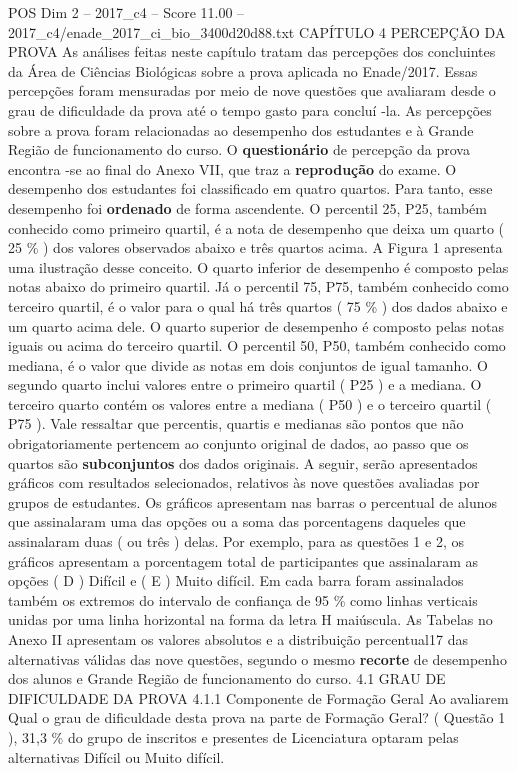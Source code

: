 \begin{textsample}{POS Dim 2 – 2017\_c4 – Score 11.00 – 2017\_c4/enade\_2017\_ci\_bio\_3400d20d88.txt}  \label{ex:f2_pos_096}
CAPÍTULO 4 PERCEPÇÃO DA PROVA As análises feitas neste capítulo tratam das percepções dos concluintes da Área de Ciências Biológicas sobre a prova aplicada no Enade/2017.
Essas percepções foram mensuradas por meio de nove questões que avaliaram desde o grau de dificuldade da prova até o tempo gasto para concluí -la.
As percepções sobre a prova foram relacionadas ao desempenho dos estudantes e à Grande Região de funcionamento do curso.
O \textbf{questionário} de percepção da prova encontra -se ao final do Anexo VII, que traz a \textbf{reprodução} do exame.
O desempenho dos estudantes foi classificado em quatro quartos.
Para tanto, esse desempenho foi \textbf{ordenado} de forma ascendente.
O percentil 25, P25, também conhecido como primeiro quartil, é a nota de desempenho que deixa um quarto ( 25 \% ) dos valores observados abaixo e três quartos acima.
A Figura 1 apresenta uma ilustração desse conceito.
O quarto inferior de desempenho é composto pelas notas abaixo do primeiro quartil.
Já o percentil 75, P75, também conhecido como terceiro quartil, é o valor para o qual há três quartos ( 75 \% ) dos dados abaixo e um quarto acima dele.
O quarto superior de desempenho é composto pelas notas iguais ou acima do terceiro quartil.
O percentil 50, P50, também conhecido como mediana, é o valor que divide as notas em dois conjuntos de igual tamanho.
O segundo quarto inclui valores entre o primeiro quartil ( P25 ) e a mediana.
O terceiro quarto contém os valores entre a mediana ( P50 ) e o terceiro quartil ( P75 ).
Vale ressaltar que percentis, quartis e medianas são pontos que não obrigatoriamente pertencem ao conjunto original de dados, ao passo que os quartos são \textbf{subconjuntos} dos dados originais.
A seguir, serão apresentados gráficos com resultados selecionados, relativos às nove questões avaliadas por grupos de estudantes.
Os gráficos apresentam nas barras o percentual de alunos que assinalaram uma das opções ou a soma das porcentagens daqueles que assinalaram duas ( ou três ) delas.
Por exemplo, para as questões 1 e 2, os gráficos apresentam a porcentagem total de participantes que assinalaram as opções ( D ) Difícil e ( E ) Muito difícil.
Em cada barra foram assinalados também os extremos do intervalo de confiança de 95 \% como linhas verticais unidas por uma linha horizontal na forma da letra H maiúscula.
As Tabelas no Anexo II apresentam os valores absolutos e a distribuição percentual17 das alternativas válidas das nove questões, segundo o mesmo \textbf{recorte} de desempenho dos alunos e Grande Região de funcionamento do curso. 4.1 GRAU DE DIFICULDADE DA PROVA 4.1.1 Componente de Formação Geral Ao avaliarem Qual o grau de dificuldade desta prova na parte de Formação Geral? ( Questão 1 ), 31,3 \% do grupo de inscritos e presentes de Licenciatura optaram pelas alternativas Difícil ou Muito difícil.

\end{textsample}
